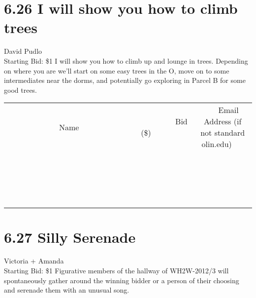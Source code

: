 \documentclass[11pt]{article}
\begin{document}
\section*{6.26 I will show you how to climb trees}
David Pudlo
\\
Starting Bid: \$1
\newline
I will show you how to climb up and lounge in trees. Depending on where you are we'll start on some easy trees in the O, move on to some intermediates near the dorms, and potentially go exploring in Parcel B for some good trees.
\\[3ex]
\begin{tabular}{c c c}
~~~~~~~~~~~~~Name~~~~~~~~~~~~~ & ~~~~~~~~~Bid (\$)~~~~~~~~~  & ~~~Email Address (if not standard olin.edu)~~~\\
 & & \\
\hline
 & & \\
\hline
 & & \\
\hline
 & & \\
\hline
 & & \\
\hline
 & & \\
\hline
 & & \\
\hline
 & & \\
\hline
 & & \\
\hline
 & & \\
\hline
 & & \\
\hline
 & & \\
\hline
 & & \\
\hline
 & & \\
\hline
 & & \\
\hline
 & & \\
\hline
 & & \\
\hline
 & & \\
\hline
 & & \\
\hline
\end{tabular}
\newpage
\section*{6.27 Silly Serenade}
Victoria + Amanda
\\
Starting Bid: \$1
\newline
Figurative members of the hallway of WH2W-2012/3 will spontaneously gather around the winning bidder or a person of their choosing and serenade them with an unusual song.
\end{document}
